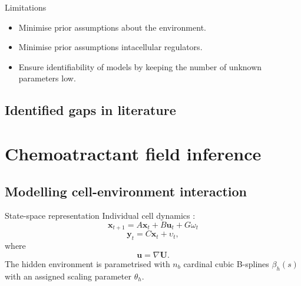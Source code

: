 \documentclass[12pt]{beamer}
\begin{document}
\begin{frame}{Limitations}

  \begin{itemize}
  	\item Minimise prior assumptions about the environment.
  	\item Minimise prior assumptions intacellular regulators.
  	\item Ensure identifiability of models by keeping the number of unknown parameters low. 
  	\end{itemize}
\end{frame}
\subsection{Identified gaps in literature}

\section{Chemoatractant field inference}

\subsection{Modelling cell-environment interaction}

\begin{frame}
	\begin{itemize}
\end{itemize}
\end{frame}

\begin{frame}{State-space representation}
Individual cell dynamics \cite{Kadirkamanathan2012}:
\begin{equation*}\label{eq_dyn}
\mathbf{x}_{t+1} = A\mathbf{x}_t + B\mathbf{u}_t + G\omega_t
\end{equation*}
\begin{equation*}\label{eq_meas}
\mathbf{y}_t = C\mathbf{x}_t + \upsilon_t,
\end{equation*}
where
\begin{equation*}
\mathbf{u}= \nabla \mathbf{U}.
\end{equation*}
The hidden environment is parametrised with $n_b$ cardinal cubic B-splines $\beta_h(s)$ with an assigned scaling parameter $\theta_h$.
\end{frame}
\end{document}
